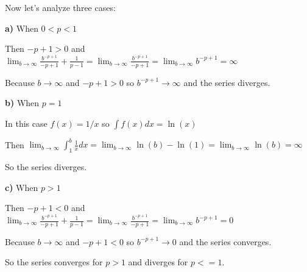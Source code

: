 \singlespacing

Now let's analyze three cases:

\singlespacing

\textbf{a)} When $0<p<1$

\singlespacing

Then $-p+1 > 0$ and $\lim_{b \to \infty} \frac{b^{-p+1}}{-p+1}  + \frac{1}{p-1} = \lim_{b \to \infty} \frac{b^{-p+1}}{-p+1} = \lim_{b \to \infty} b^{-p+1} = \infty$

\singlespacing

Because $b \to \infty$ and $-p+1 > 0$ so $b^{-p+1} \to \infty$ and the series diverges.

\singlespacing

\textbf{b)} When $p=1$

\singlespacing

In this case $f(x) = 1/x$ so $\int f(x) dx = \ln(x)$

\singlespacing

Then $\lim_{b \to \infty} \int_{1}^{b} \frac{1}{x} dx = \lim_{b \to \infty} \ln(b) - \ln(1) = \lim_{b \to \infty} \ln(b) = \infty$

\singlespacing

So the series diverges.

\singlespacing

\textbf{c)} When $p>1$

\singlespacing

Then $-p+1 < 0$ and $\lim_{b \to \infty} \frac{b^{-p+1}}{-p+1}  + \frac{1}{p-1} = \lim_{b \to \infty} \frac{b^{-p+1}}{-p+1} = \lim_{b \to \infty} b^{-p+1} = 0$

\singlespacing

Because $b \to \infty$ and $-p+1 < 0$ so $b^{-p+1} \to 0$ and the series converges.

\singlespacing
\singlespacing
\singlespacing

So the series converges for $p>1$ and diverges for $p<=1$.